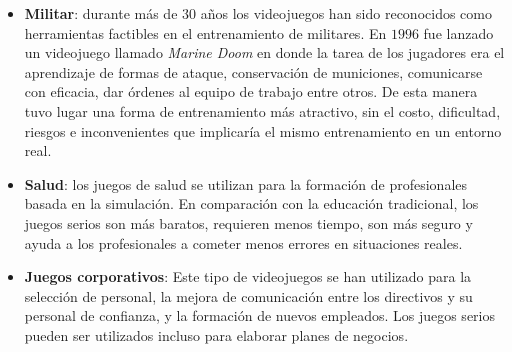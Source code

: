 \begin{itemize}

\item \textbf{Militar}: durante más de $30$ años los videojuegos han sido
    reconocidos como herramientas factibles en el entrenamiento de militares. En
    $1996$ fue lanzado un videojuego llamado \emph{Marine Doom} en donde la
    tarea de los jugadores era el aprendizaje de formas de ataque, conservación
    de municiones, comunicarse con eficacia, dar órdenes al equipo de trabajo
    entre otros. De esta manera tuvo lugar una forma de entrenamiento más
    atractivo, sin el costo, dificultad, riesgos e inconvenientes que implicaría
    el mismo entrenamiento en un entorno real\cite{education:games}.

\item \textbf{Salud}: los juegos de salud se utilizan para la formación de
    profesionales basada en la simulación. En comparación con la educación
    tradicional, los juegos serios son más baratos, requieren menos tiempo, son
    más seguro y ayuda a los profesionales a cometer menos errores en
    situaciones reales\cite{education:games}. 

\item \textbf{Juegos corporativos}: Este tipo de videojuegos se han utilizado
    para la selección de personal, la mejora de comunicación entre los
    directivos y su personal de confianza, y la formación de nuevos empleados.
    Los juegos serios pueden ser utilizados incluso para elaborar planes de
    negocios\cite{education:games}. 

\end{itemize}

